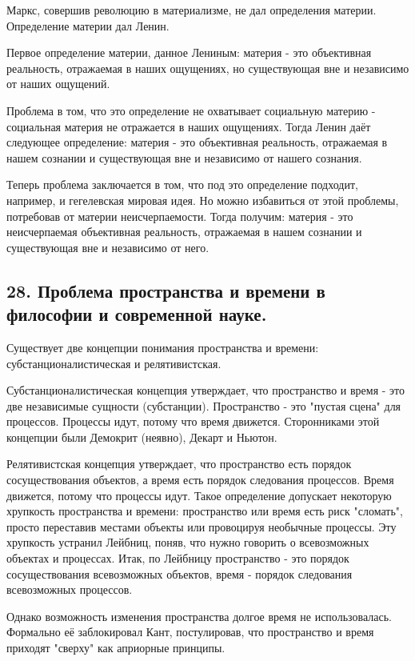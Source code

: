 \documentclass[a4paper, 12pt]{article}
\begin{document}
Маркс, совершив революцию в материализме, не дал определения материи.
Определение материи дал Ленин.

Первое определение материи, данное Лениным:
материя - это объективная реальность, отражаемая в наших ощущениях, но существующая вне и независимо от наших ощущений.

Проблема в том, что это определение не охватывает социальную материю - социальная материя не отражается в наших ощущениях.
Тогда Ленин даёт следующее определение:
материя - это объективная реальность, отражаемая в нашем сознании и существующая вне и независимо от нашего сознания.

Теперь проблема заключается в том, что под это определение подходит, например, и гегелевская мировая идея.
Но можно избавиться от этой проблемы, потребовав от материи неисчерпаемости.
Тогда получим:
материя - это неисчерпаемая объективная реальность, отражаемая в нашем сознании и существующая вне и независимо от него.


\subsection*{\textbf{28. Проблема пространства и времени в философии и современной науке.}}

Существует две концепции понимания пространства и времени: субстанционалистическая и релятивистская.

Субстанционалистическая концепция утверждает, что пространство и время - это две независимые сущности (субстанции).
Пространство - это "пустая сцена" для процессов.
Процессы идут, потому что время движется.
Сторонниками этой концепции были Демокрит (неявно), Декарт и Ньютон.

Релятивистская концепция утверждает, что пространство есть порядок сосуществования объектов, а время есть порядок следования процессов.
Время движется, потому что процессы идут.
Такое определение допускает некоторую хрупкость пространства и времени: пространство или время есть риск "сломать", просто переставив местами объекты или провоцируя необычные процессы.
Эту хрупкость устранил Лейбниц, поняв, что нужно говорить о всевозможных объектах и процессах.
Итак, по Лейбницу пространство - это порядок сосуществования всевозможных объектов, время - порядок следования всевозможных процессов.

Однако возможность изменения пространства долгое время не использовалась.
Формально её заблокировал Кант, постулировав, что пространство и время приходят "сверху" как априорные принципы.
\end{document}
